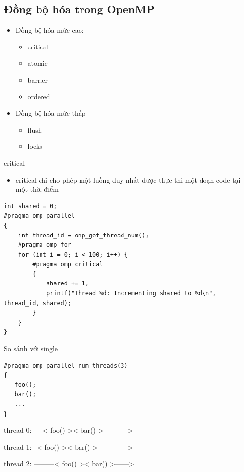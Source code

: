 \documentclass[10pt]{beamer}
\theoremstyle{remark}
\numberwithin{algocf}{section}
\numberwithin{equation}{section}
\numberwithin{dl}{section}
\numberwithin{figure}{section}
\begin{document}
\subsection{Đồng bộ hóa trong OpenMP}
\begin{frame}
    \begin{itemize}
        \item Đồng bộ hóa mức cao:
        \begin{itemize}
            \item critical
            \item atomic 
            \item barrier
            \item ordered
        \end{itemize}
        \item Đồng bộ hóa mức thấp
        \begin{itemize}
            \item flush
            \item locks
        \end{itemize}
    \end{itemize}
\end{frame}

\begin{frame}[fragile]{critical}
    \begin{itemize}
        \item critical chỉ cho phép một luồng duy nhất được thực thi một đoạn code tại một thời điểm
    \end{itemize}

    \begin{verbatim}
int shared = 0;
#pragma omp parallel
{
    int thread_id = omp_get_thread_num();
    #pragma omp for
    for (int i = 0; i < 100; i++) {
        #pragma omp critical
        {
            shared += 1;
            printf("Thread %d: Incrementing shared to %d\n", thread_id, shared);
        }
    }
}
    \end{verbatim}
\end{frame}

\begin{frame}[fragile]{So sánh với single}
    \begin{verbatim}
#pragma omp parallel num_threads(3)
{
   foo();
   bar();
   ...
}
    \end{verbatim}
thread 0: ----< foo() >< bar() >----------->

thread 1: --< foo() >< bar() >------------->

thread 2: ---------< foo() >< bar() >------>
\end{frame}
\end{document}
